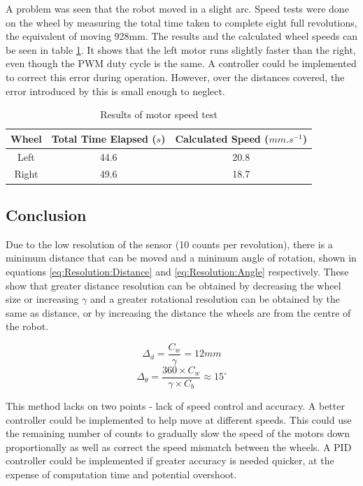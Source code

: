 A problem was seen that the robot moved in a slight arc. Speed tests were done on the wheel by measuring the total time taken to complete eight full revolutions, the equivalent of moving 928mm. The results and the calculated wheel speeds can be seen in table \ref{table:results:motor:speed}. It shows that the left motor runs slightly faster than the right, even though the PWM duty cycle is the same. A controller could be implemented to correct this error during operation. However, over the distances covered, the error introduced by this is small enough to neglect. 

\begin{table}
\caption{Results of motor speed test}
\label{table:results:motor:speed}
\centering
\begin{tabular}{|c|c|c|} \hline
Wheel &	Total Time Elapsed ($s$) & Calculated Speed ($mm.s^{-1}$) \\ \hline
Left & 44.6		&	20.8 \\ \hline
Right & 49.6	&	18.7 \\ \hline
\end{tabular}
\end{table}

\subsection{Conclusion}
Due to the low resolution of the sensor (10 counts per revolution), there is a minimum distance that can be moved and a minimum angle of rotation, shown in equations \eqref{eq:Resolution:Distance} and \eqref{eq:Resolution:Angle} respectively. These show that greater distance resolution can be obtained by decreasing the wheel size or increasing $\gamma$ and a greater rotational resolution can be obtained by the same as distance, or by increasing the distance the wheels are from the centre of the robot. 


\begin{equation}\label{eq:Resolution:Distance}
\Delta_{d} = \frac{C_w}{\gamma} = 12mm
\end{equation}
\begin{equation}\label{eq:Resolution:Angle}
\Delta_{\theta} = \frac{360 \times C_w}{\gamma \times C_b} \approx 15^\circ 
\end{equation}

This method lacks on two points - lack of speed control and accuracy.
A better controller could be implemented to help move at different speeds. This could use the remaining number of counts to gradually slow the speed of the motors down proportionally as well as correct the speed mismatch between the wheels. A PID controller could be implemented if greater accuracy is needed quicker, at the expense of computation time and potential overshoot. 

